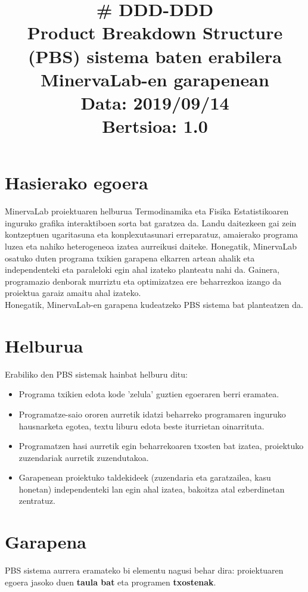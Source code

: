 \documentclass[10pt,a4paper]{article}
\title{\cf \# DDD-DDD \\ \vspace{5mm}
					Product Breakdown Structure (PBS) sistema baten erabilera MinervaLab-en garapenean \\
\normalsize \vspace{5mm} Data: 2019/09/14 \\
 			\vspace{3mm} Bertsioa: 1.0}
\date{}
\begin{document}
\maketitle
\thispagestyle{fancy}

\section{Hasierako egoera}
MinervaLab proiektuaren helburua Termodinamika eta Fisika Estatistikoaren inguruko grafika interaktiboen sorta bat garatzea da. Landu daitezkeen gai zein kontzeptuen ugaritasuna eta konplexutasunari erreparatuz, amaierako programa luzea eta nahiko heterogeneoa izatea aurreikusi daiteke. Honegatik, MinervaLab osatuko duten programa txikien garapena elkarren artean ahalik eta independenteki eta paraleloki egin ahal izateko planteatu nahi da. Gainera, programazio denborak murriztu eta optimizatzea ere beharrezkoa izango da proiektua garaiz amaitu ahal izateko.
\\

Honegatik, MinervaLab-en garapena kudeatzeko PBS sistema bat planteatzen da. 

\section{Helburua}
Erabiliko den PBS sistemak hainbat helburu ditu:
\begin{itemize}
\item Programa txikien edota kode 'zelula' guztien egoeraren berri eramatea.
\item Programatze-saio ororen aurretik idatzi beharreko programaren inguruko hausnarketa egotea, textu liburu edota beste iturrietan oinarrituta.
\item  Programatzen hasi aurretik egin beharrekoaren txosten bat izatea, proiektuko zuzendariak aurretik zuzendutakoa.
\item Garapenean proiektuko taldekideek (zuzendaria eta garatzailea, kasu honetan) independenteki lan egin ahal izatea, bakoitza atal ezberdinetan zentratuz.
\end{itemize}

 
\section{Garapena}
PBS sistema aurrera eramateko bi elementu nagusi behar dira: proiektuaren egoera jasoko duen \textbf{taula bat} eta programen \textbf{txostenak}.
\\
\end{document}
